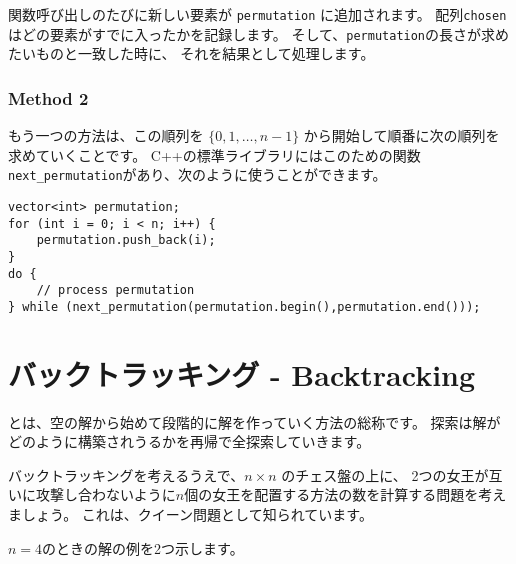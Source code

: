 関数呼び出しのたびに新しい要素が
\texttt{permutation}
に追加されます。
配列\texttt{chosen} はどの要素がすでに入ったかを記録します。
そして、\texttt{permutation}の長さが求めたいものと一致した時に、
それを結果として処理します。

\subsubsection{Method 2}


もう一つの方法は、この順列を
$\{0,1,\ldots,n-1\}$ から開始して順番に次の順列を求めていくことです。
C++の標準ライブラリにはこのための関数
\texttt{next\_permutation}があり、次のように使うことができます。

\begin{lstlisting}
vector<int> permutation;
for (int i = 0; i < n; i++) {
    permutation.push_back(i);
}
do {
    // process permutation
} while (next_permutation(permutation.begin(),permutation.end()));
\end{lstlisting}

\section{バックトラッキング - Backtracking}


とは、空の解から始めて段階的に解を作っていく方法の総称です。
探索は解がどのように構築されうるかを再帰で全探索していきます。


バックトラッキングを考えるうえで、$n \times n$ のチェス盤の上に、
2つの女王が互いに攻撃し合わないように$n$個の女王を配置する方法の数を計算する問題を考えましょう。
これは、クイーン問題として知られています。

$n=4$のときの解の例を2つ示します。
\begin{center}
\end{center}

